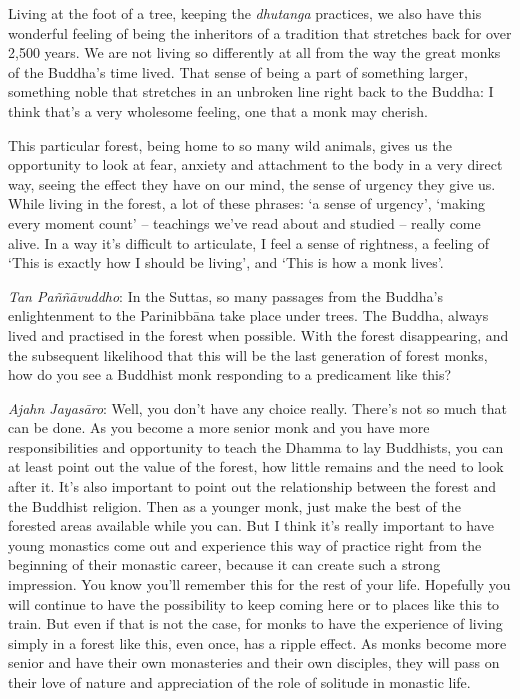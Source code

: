 Living at the foot of a tree, keeping the \emph{dhutanga} practices, we
also have this wonderful feeling of being the inheritors of a tradition
that stretches back for over 2,500 years. We are not living so
differently at all from the way the great monks of the Buddha's time
lived. That sense of being a part of something larger, something noble
that stretches in an unbroken line right back to the Buddha: I think
that's a very wholesome feeling, one that a monk may cherish. 

This particular forest, being home to so many wild animals, gives us the
opportunity to look at fear, anxiety and attachment to the body in a
very direct way, seeing the effect they have on our mind, the sense of
urgency they give us. While living in the forest, a lot of these
phrases: `a sense of urgency', `making every moment count' -- teachings
we've read about and studied -- really come alive. In a way it's
difficult to articulate, I feel a sense of rightness, a feeling of `This
is exactly how I should be living', and `This is how a monk lives'. 

\emph{Tan Paññāvuddho}: In the Suttas, so many passages from the
Buddha's enlightenment to the Parinibbāna take place under trees. The
Buddha, always lived and practised in the forest when possible. With the
forest disappearing, and the subsequent likelihood that this will be the
last generation of forest monks, how do you see a Buddhist monk
responding to a predicament like this? 

\emph{Ajahn Jayasāro}: Well, you don't have any choice really. There's
not so much that can be done. As you become a more senior monk and you
have more responsibilities and opportunity to teach the Dhamma to lay
Buddhists, you can at least point out the value of the forest, how
little remains and the need to look after it. It's also important to
point out the relationship between the forest and the Buddhist religion. 
Then as a younger monk, just make the best of the forested areas
available while you can. But I think it's really important to have young
monastics come out and experience this way of practice right from the
beginning of their monastic career, because it can create such a strong
impression. You know you'll remember this for the rest of your life. 
Hopefully you will continue to have the possibility to keep coming here
or to places like this to train. But even if that is not the case, for
monks to have the experience of living simply in a forest like this, 
even once, has a ripple effect. As monks become more senior and have
their own monasteries and their own disciples, they will pass on their
love of nature and appreciation of the role of solitude in monastic
life. 

